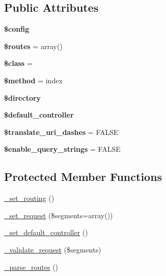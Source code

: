 \subsection*{Public Attributes}
\begin{DoxyCompactItemize}
\item 
\mbox{\label{class_c_i___router_a24bbe3e58eee7f725936f25815f5dc2f}} 
{\bfseries \$config}
\item 
\mbox{\label{class_c_i___router_a6d9e80de8462f33515b9ce4a71e6a768}} 
{\bfseries \$routes} = array()
\item 
\mbox{\label{class_c_i___router_afe7ef15a89a8dd6abb690620c7de2c5e}} 
{\bfseries \$class} = \textquotesingle{}\textquotesingle{}
\item 
\mbox{\label{class_c_i___router_af84d2337b8b9d1b948946f60d860093a}} 
{\bfseries \$method} = \textquotesingle{}index\textquotesingle{}
\item 
\mbox{\label{class_c_i___router_ad131c1a4901e9a5ad3d43610d2fb8e29}} 
{\bfseries \$directory}
\item 
\mbox{\label{class_c_i___router_a16c6a786b271918f31f2d66f8a34f998}} 
{\bfseries \$default\+\_\+controller}
\item 
\mbox{\label{class_c_i___router_a2393962eab29bc31e3f42a0753c86f4c}} 
{\bfseries \$translate\+\_\+uri\+\_\+dashes} = F\+A\+L\+SE
\item 
\mbox{\label{class_c_i___router_a953fd51705a86bc6bdc87cabd1e8e925}} 
{\bfseries \$enable\+\_\+query\+\_\+strings} = F\+A\+L\+SE
\end{DoxyCompactItemize}
\subsection*{Protected Member Functions}
\begin{DoxyCompactItemize}
\item 
\mbox{\hyperlink{class_c_i___router_aab7a56592f3121891fb6757fadc614e4}{\+\_\+set\+\_\+routing}} ()
\item 
\mbox{\hyperlink{class_c_i___router_a686a9ad1e27d85cec9bb4e11285c8906}{\+\_\+set\+\_\+request}} (\$segments=array())
\item 
\mbox{\hyperlink{class_c_i___router_a4e4e6149b6e0612f1c5c154139881ba1}{\+\_\+set\+\_\+default\+\_\+controller}} ()
\item 
\mbox{\hyperlink{class_c_i___router_a8c534474aa24287176ff26879543ed87}{\+\_\+validate\+\_\+request}} (\$segments)
\item 
\mbox{\hyperlink{class_c_i___router_a1b8a6b811df185009b34f3cf1c3a21e6}{\+\_\+parse\+\_\+routes}} ()
\end{DoxyCompactItemize}


